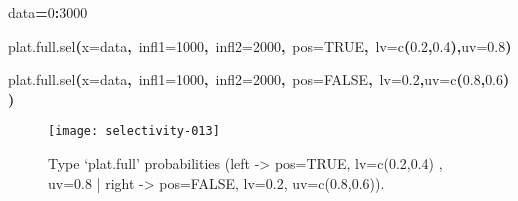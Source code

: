 \documentclass[letterpaper, 12pt]{article}
\newenvironment{Hinput}%
{}%
{}%
\newenvironment{Hchunk}%
{\vspace{0.5em}\par\begin{flushleft}}%
{\end{flushleft}}%
\newcommand{\hlnumber}[1]{\textcolor[rgb]{0.0823529411764706,0.0784313725490196,0.709803921568627}{#1}}%
\newcommand{\hlfunctioncall}[1]{\textcolor[rgb]{1,0,0}{#1}}%
\newcommand{\hlkeyword}[1]{\textcolor[rgb]{0,0,0}{\textbf{#1}}}%
\newcommand{\hlargument}[1]{\textcolor[rgb]{0.694117647058824,0.247058823529412,0.0196078431372549}{#1}}%
\newcommand{\hlassignement}[1]{\textcolor[rgb]{0.215686274509804,0.215686274509804,0.384313725490196}{\textbf{#1}}}%
\newcommand{\hlsymbol}[1]{\textcolor[rgb]{0,0,0}{#1}}%
\newcommand{\hlprompt}[1]{\textcolor[rgb]{0,0,0}{#1}}%
\begin{document}
\begin{Hchunk}
\begin{normalsize}
\begin{Hinput}
\ttfamily\noindent
\hlprompt{\usebox{\hlnormalsizeboxgreaterthan}{\ }}\hlsymbol{data}\hlassignement{=}\hlnumber{0}\hlkeyword{:}\hlnumber{3000}\mbox{}
\normalfont
\end{Hinput}


\begin{Hinput}
\ttfamily\noindent
\hlprompt{\usebox{\hlnormalsizeboxgreaterthan}{\ }}\hlfunctioncall{plat.full.sel}\hlkeyword{(}\hlargument{x}\hlargument{=}\hlsymbol{data}\hlkeyword{,}{\ }\hlargument{infl1}\hlargument{=}\hlnumber{1000}\hlkeyword{,}{\ }\hlargument{infl2}\hlargument{=}\hlnumber{2000}\hlkeyword{,}{\ }\hlargument{pos}\hlargument{=}\hlnumber{TRUE}\hlkeyword{,}{\ }\hlargument{lv}\hlargument{=}\hlfunctioncall{c}\hlkeyword{(}\hlnumber{0.2}\hlkeyword{,}\hlnumber{0.4}\hlkeyword{)}\hlkeyword{,}\hlargument{uv}\hlargument{=}\hlnumber{0.8}\hlkeyword{)}\mbox{}
\normalfont
\end{Hinput}


\begin{Hinput}
\ttfamily\noindent
\hlprompt{\usebox{\hlnormalsizeboxgreaterthan}{\ }}\hlfunctioncall{plat.full.sel}\hlkeyword{(}\hlargument{x}\hlargument{=}\hlsymbol{data}\hlkeyword{,}{\ }\hlargument{infl1}\hlargument{=}\hlnumber{1000}\hlkeyword{,}{\ }\hlargument{infl2}\hlargument{=}\hlnumber{2000}\hlkeyword{,}{\ }\hlargument{pos}\hlargument{=}\hlnumber{FALSE}\hlkeyword{,}{\ }\hlargument{lv}\hlargument{=}\hlnumber{0.2}\hlkeyword{,}\hlargument{uv}\hlargument{=}\hlfunctioncall{c}\hlkeyword{(}\hlnumber{0.8}\hlkeyword{,}\hlnumber{0.6}\hlkeyword{)}\hlkeyword{)}\mbox{}
\normalfont
\end{Hinput}


\end{normalsize}
\end{Hchunk}

\begin{figure}[h]
\vspace{-20pt}
\begin{center}
\texttt{[image: selectivity-013]}
\end{center}
\vspace{-30pt}
\caption{Type `plat.full' probabilities (left -> pos=TRUE, lv=c(0.2,0.4) , uv=0.8 | right -> pos=FALSE, lv=0.2, uv=c(0.8,0.6)).}
\vspace{-10pt}
\label{fig6}
\end{figure}
\end{document}
